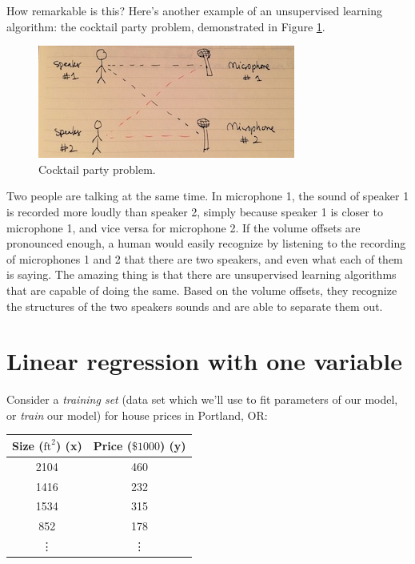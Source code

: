 \documentclass{article}
\theoremstyle{definition}
\begin{document}
How remarkable is this? Here's another example of an unsupervised learning algorithm: the cocktail party problem, demonstrated in Figure \ref{intro-cocktail}.

\begin{figure}[ht]
\centering
\includegraphics[scale=0.8]{images/intro/cocktail.jpg}
\caption{Cocktail party problem.}
\label{intro-cocktail}
\end{figure}

Two people are talking at the same time. In microphone 1, the sound of speaker 1 is recorded more loudly than speaker 2, simply because speaker 1 is closer to microphone 1, and vice versa for microphone 2. If the volume offsets are pronounced enough, a human would easily recognize by listening to the recording of microphones 1 and 2 that there are two speakers, and even what each of them is saying. The amazing thing is that there are unsupervised learning algorithms that are capable of doing the same. Based on the volume offsets, they recognize the structures of the two speakers sounds and are able to separate them out.


\section{Linear regression with one variable}
Consider a \textit{training set} (data set which we'll use to fit parameters of our model, or \textit{train} our model) for house prices in Portland, OR:

\begin{center}
\begin{tabular}{ |c|c| } 
 \hline
 Size ($\text{ft}^2$) (x) & Price ($\$1000$) (y) \\
 \hline
 2104 & 460 \\
 1416 & 232 \\
 1534 & 315 \\
 852 & 178 \\
 \vdots & \vdots \\
 \hline
\end{tabular}
\end{center}
\end{document}
